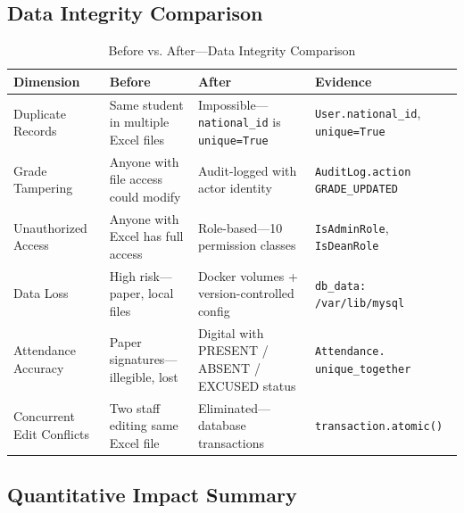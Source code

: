 \subsection{Data Integrity Comparison}

\begin{table}[H]
    \centering
    \renewcommand{\arraystretch}{1.4}
    \small
    \begin{tabular}{|p{2.2cm}|p{2.8cm}|p{4.5cm}|p{4cm}|}
        \hline
        \textbf{Dimension} & \textbf{Before} & \textbf{After} & \textbf{Evidence} \\
        \hline
        Duplicate Records & Same student in multiple Excel files & Impossible---\texttt{national\_id} is \texttt{unique=True} & \texttt{User.national\_id}, \newline \texttt{unique=True} \\
        \hline
        Grade Tampering & Anyone with file access could modify & Audit-logged with actor identity & \texttt{AuditLog.action} \newline \texttt{GRADE\_UPDATED} \\
        \hline
        Unauthorized Access & Anyone with Excel has full access & Role-based---10 permission classes & \texttt{IsAdminRole}, \newline \texttt{IsDeanRole} \\
        \hline
        Data Loss & High risk---paper, local files & Docker volumes + version-controlled config & \texttt{db\_data:} \newline \texttt{/var/lib/mysql} \\
        \hline
        Attendance Accuracy & Paper signatures---illegible, lost & Digital with PRESENT / ABSENT / EXCUSED status & \texttt{Attendance.} \newline \texttt{unique\_together} \\
        \hline
        Concurrent Edit Conflicts & Two staff editing same Excel file & Eliminated---database transactions & \texttt{transaction.atomic()} \\
        \hline
    \end{tabular}
    \caption{Before vs. After---Data Integrity Comparison}
    \label{tab:before-after-integrity}
\end{table}

\subsection{Quantitative Impact Summary}

